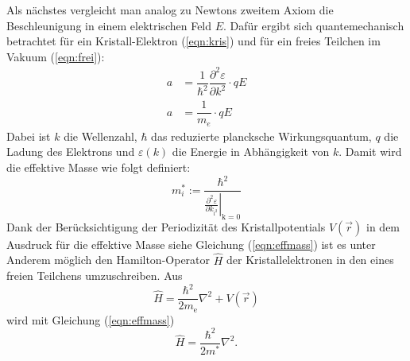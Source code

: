 Als nächstes vergleicht man analog zu Newtons zweitem Axiom die Beschleunigung in einem elektrischen Feld $E$. Dafür ergibt sich quantemechanisch betrachtet für ein Kristall-Elektron (\ref{eqn:kris})
 und für ein freies Teilchen im Vakuum (\ref{eqn:frei}):
\begin{align}
  \label{eqn:kris}
  a&=\dfrac{1}{\hbar^2}\dfrac{\partial^2 \varepsilon}{\partial k^2}\cdot qE \\
  \label{eqn:frei}
  a&=\dfrac{1}{m_e}\cdot qE
\end{align}
Dabei ist $k$ die Wellenzahl, $\hbar$ das reduzierte plancksche Wirkungsquantum, $q$ die Ladung des Elektrons und $\varepsilon(k)$ die Energie in Abhängigkeit von $k$.
Damit wird die effektive Masse wie folgt definiert:
\begin{equation}
  \label{eqn:effmass}
  m^{*}_i := \frac{\hbar^2}{\left.\frac{\partial^2 \varepsilon}{\partial k_\mathrm{i^2}}\right|_\mathrm{k=0}}
\end{equation}
Dank der Berücksichtigung der Periodizität des Kristallpotentials $V(\vec{r})$ in dem Ausdruck für die effektive Masse siehe Gleichung (\ref{eqn:effmass}) ist es unter Anderem möglich den Hamilton-Operator $\hat{H}$ der Kristallelektronen in den
eines freien Teilchens umzuschreiben. Aus
\begin{equation*}
  \hat{H}=\dfrac{\hbar^2}{2m_\mathrm{e}}\nabla^2+V(\vec{r})
\end{equation*}
wird mit Gleichung (\ref{eqn:effmass})
\begin{equation*}
  \hat{H}=\dfrac{\hbar^2}{2m^*}\nabla^2 .
\end{equation*}
